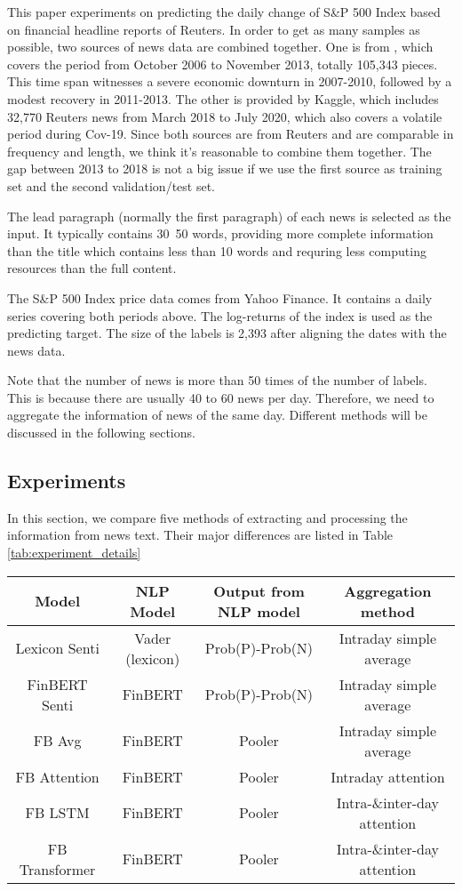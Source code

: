 \documentclass[11pt]{article}
\begin{document}
This paper experiments on predicting the daily change of S\&P 500 Index based on financial headline reports of Reuters. In order to get as many samples as possible, two sources of news data are combined together. One is from \citet{ding-etal-2014-using}, which covers the period from October 2006 to November 2013, totally 105,343 pieces. This time span witnesses a severe economic downturn in 2007-2010, followed by a modest recovery in 2011-2013. The other is provided by Kaggle, which includes 32,770 Reuters news from March 2018 to July 2020, which also covers a volatile period during Cov-19. Since both sources are from Reuters and are comparable in frequency and length, we think it's reasonable to combine them together. The gap between 2013 to 2018 is not a big issue if we use the first source as training set and the second validation/test set. 

The lead paragraph (normally the first paragraph) of each news is selected as the input. It typically contains 30~50 words, providing more complete information than the title which contains less than 10 words and requring less computing resources than the full content.

The S\&P 500 Index price data comes from Yahoo Finance. It contains a daily series covering both periods above. The log-returns of the index is used as the predicting target. The size of the labels is 2,393 after aligning the dates with the news data. 

Note that the number of news is more than 50 times of the number of labels. This is because there are usually 40 to 60 news per day. Therefore, we need to aggregate the information of news of the same day. Different methods will be discussed in the following sections. 

\subsection{Experiments}

In this section, we compare five methods of extracting and processing the information from news text. Their major differences are listed in Table \ref{tab:experiment_details}

\begin{table*}[t]
  \centering
  \begin{tabular}{|c|c|c|c|}
  \hline
  Model & NLP Model & Output from NLP model & Aggregation method \\
  \hline
  Lexicon Senti & Vader (lexicon) & Prob(P)-Prob(N) & Intraday simple average \\
  FinBERT Senti & FinBERT & Prob(P)-Prob(N) & Intraday simple average \\
  FB Avg & FinBERT & Pooler & Intraday simple average \\
  FB Attention & FinBERT & Pooler & Intraday attention\\
  FB LSTM & FinBERT & Pooler &  Intra-\&inter-day attention\\
  FB Transformer & FinBERT & Pooler &  Intra-\&inter-day attention\\
  \hline
  \end{tabular}
  \caption{Major settings of the Models}
  \label{tab:experiment_details}
\end{table*}
\end{document}

